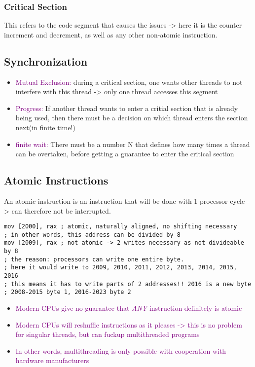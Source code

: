\documentclass[main.tex,fontsize=8pt,paper=a4,paper=portrait,DIV=calc,]{scrartcl}
\begin{document}
\subsubsection{Critical Section}
This refers to the code segment that causes the issues -> here it is the counter increment and decrement, as well as any other non-atomic instruction.

\subsection{Synchronization}
\begin{itemize}
\item \textcolor{purple}{Mutual Exclusion:} \newline
  during a critical section, one wants other threads to not interfere with this thread -> only one thread accesses this segment
\item \textcolor{purple}{Progress:} If another thread wants to enter a critial section that is already being used, then there must be a decision on which thread enters the section next(in finite time!)
\item \textcolor{purple}{finite wait:} There must be a number N that defines how many times a thread can be overtaken, before getting a guarantee to enter the critical section
\end{itemize} 

\subsection{Atomic Instructions}
An atomic instruction is an instruction that will be done with 1 processor cycle -> can therefore not be interrupted.\newline
\begin{lstlisting}
mov [2000], rax ; atomic, naturally aligned, no shifting necessary
; in other words, this address can be divided by 8 
mov [2009], rax ; not atomic -> 2 writes necessary as not divideable by 8
; the reason: processors can write one entire byte.
; here it would write to 2009, 2010, 2011, 2012, 2013, 2014, 2015, 2016
; this means it has to write parts of 2 addresses!! 2016 is a new byte
; 2008-2015 byte 1, 2016-2023 byte 2
\end{lstlisting}
\begin{itemize}
  \item \textcolor{purple}{Modern CPUs give no guarantee that \emph{ANY} instruction definitely is atomic}
\item \textcolor{purple}{Modern CPUs will reshuffle instructions as it pleases -> this is no problem for singular threads, but can fuckup multithreaded programs}
\item \textcolor{purple}{In other words, multithreading is only possible with cooperation with hardware manufacturers}
\end{itemize} 
\end{document}
